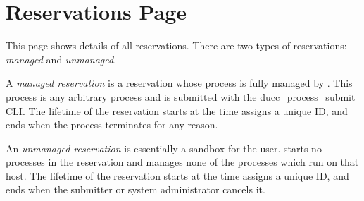 % 
% 
% 
% 

\section{Reservations Page}
\label{sec:ws-reservations}

This page shows details of all reservations.  There are two types of reservations: {\em managed}
and {\em unmanaged}.

A {\em managed reservation} is a reservation whose process is fully managed by {\DUCC}.  This process
is any arbitrary process and is submitted with the
\hyperref[sec:cli.ducc-process-submit]{ducc\_process\_submit} CLI.  The lifetime of the reservation
starts at the time {\DUCC} assigns a unique ID, and ends when the process terminates for any reason.

An {\em unmanaged reservation} is essentially a sandbox for the user.  {\DUCC} starts no processes
in the reservation and manages none of the processes which run on that host.  The lifetime of the
reservation starts at the time {\DUCC} assigns a unique ID, and ends when the submitter or system
administrator cancels it.

